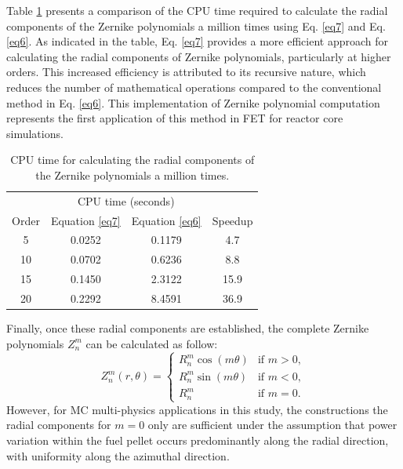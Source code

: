 Table \ref{tab_z} presents a comparison of the CPU time required to calculate the radial components of the Zernike polynomials a million times using Eq. \ref{eq7} and Eq. \ref{eq6}. As indicated in the table, Eq. \ref{eq7} provides a more efficient approach for calculating the radial components of Zernike polynomials, particularly at higher orders. This increased efficiency is attributed to its recursive nature, which reduces the number of mathematical operations compared to the conventional method in Eq. \ref{eq6}. This implementation of Zernike polynomial computation represents the first application of this method in FET for reactor core simulations.

\begin{table}
    \centering
    \caption[CPU time for calculating the radial components of the Zernike polynomials]{CPU time for calculating the radial components of the Zernike polynomials a million times.}
    \label{tab_z} 
    \begin{tabular}{| c | c | c | c | }
    \hline
           & \multicolumn{2}{c|}{CPU time (seconds)} &        \\
    \cline{2-3}
     Order & Equation \ref{eq7} & Equation \ref{eq6} & Speedup \\
     \hline
     5    & 0.0252  & 0.1179 & 4.7      \\ \hline
     10   & 0.0702  & 0.6236 & 8.8      \\ \hline
     15   & 0.1450  & 2.3122 & 15.9     \\ \hline
     20   & 0.2292  & 8.4591 & 36.9     \\ \hline
    \end{tabular}
\end{table}

Finally, once these radial components are established, the complete Zernike polynomials $Z_n^m$ can be calculated as follow:
\begin{equation}
Z_n^m(r,\theta) = 
\begin{cases} 
    R_n^m \cos (m\theta) & \text{if } m > 0, \\
    R_n^m \sin (m\theta) & \text{if } m < 0, \\
    R_n^m                & \text{if } m = 0.
\end{cases}
\end{equation}
However, for MC multi-physics applications in this study, the constructions the radial components for $m=0$ only are sufficient under the assumption that power variation within the fuel pellet occurs predominantly along the radial direction, with uniformity along the azimuthal direction.

